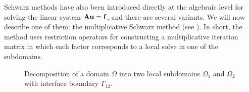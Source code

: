 Schwarz methods have also been introduced directly at the algebraic level for
solving the linear system $\mathbf{A}\mathbf{u}=\mathbf{f}$, and there are several variants. We will now
describe one of them: the multiplicative Schwarz method (see \cite{BenFroNabSzy01}). In short, the method
uses restriction operators for constructing a multiplicative iteration matrix
in which each factor corresponds to a local solve in one of the subdomains.


\begin{figure}[h]
\centering
%
\begin{turn}{90}
\end{turn}
\vspace*{-5cm}
\caption{Decomposition of a domain $\Omega$ into two local subdomains $\Omega_1$ and $\Omega_2$ with interface boundary $\Gamma_{12}$.}
\label{fig:back:2DSchwarzdomain}
\end{figure}

